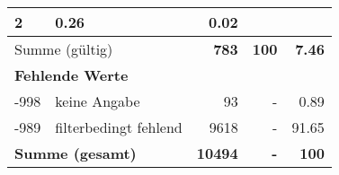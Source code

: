 \begin{longtable}{lXrrr}
       \num{2} &
       \num[round-mode=places,round-precision=2]{0,26} &
         \num[round-mode=places,round-precision=2]{0,02} \\
     \midrule
     \multicolumn{2}{l}{Summe (gültig)} &
       \textbf{\num{783}} &
     \textbf{100} &
       \textbf{\num[round-mode=places,round-precision=2]{7,46}} \\
     \multicolumn{5}{l}{\textbf{Fehlende Werte}}\\
       -998 &
       keine Angabe &
         \num{93} &
        - &
         \num[round-mode=places,round-precision=2]{0,89} \\
       -989 &
       filterbedingt fehlend &
         \num{9618} &
        - &
         \num[round-mode=places,round-precision=2]{91,65} \\
     \midrule
     \multicolumn{2}{l}{\textbf{Summe (gesamt)}} &
          \textbf{\num{10494}} &
        \textbf{-} &
        \textbf{100} \\
     \bottomrule
     \end{longtable}
     
